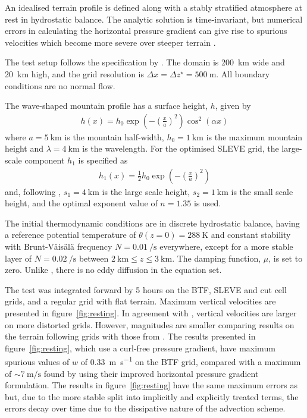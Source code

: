 \documentclass{ametsoc}
\begin{document}
An idealised terrain profile is defined along with a stably stratified atmosphere at rest in hydrostatic balance.  The analytic solution is time-invariant, but numerical errors in calculating the horizontal pressure gradient can give rise to spurious velocities which become more severe over steeper terrain \citep{klemp2011}.

The test setup follows the specification by \cite{klemp2011}.  The domain is \SI{200}{\kilo\meter} wide and \SI{20}{\kilo\meter} high, and the grid resolution is \(\Delta x = \Delta z^\star = \SI{500}{\meter}\).  All boundary conditions are no normal flow.

The wave-shaped mountain profile has a surface height, $h$, given by
\begin{align}
	h(x) = h_0 \exp \left( - \left( \frac{x}{a} \right)^2 \right) \cos^2 \left( \alpha x \right) \label{eqn:resting:mountain}
\end{align}
where $a = \SI{5}{\kilo\meter}$ is the mountain half-width, $h_0 = \SI{1}{\kilo\meter}$ is the maximum mountain height and $\lambda = \SI{4}{\kilo\meter}$ is the wavelength.  For the optimised SLEVE grid, the large-scale component $h_1$ is specified as
\begin{align}
h_1(x) = \frac{1}{2} h_0 \exp \left( - \left( \frac{x}{a} \right)^2 \right)
\end{align}
and, following \cite{leuenberger2010}, $s_1 = \SI{4}{\kilo\meter}$ is the large scale height, $s_2 = \SI{1}{\kilo\meter}$ is the small scale height, and the optimal exponent value of $n = 1.35$ is used.

The initial thermodynamic conditions are in discrete hydrostatic balance, having a reference potential temperature of $\theta(z = 0) = \SI{288}{\kelvin}$ and constant stability with Brunt-V\"ais\"al\"a frequency $N = \SI{0.01}{\per\second}$ everywhere, except for a more stable layer of $N = \SI{0.02}{\per\second}$ between $\SI{2}{\kilo\meter} \leq z \leq \SI{3}{\kilo\meter}$.  The damping function, \(\mu\), is set to zero.  Unlike \citet{klemp2011}, there is no eddy diffusion in the equation set.

The test was integrated forward by 5 hours on the BTF, SLEVE and cut cell grids, and a regular grid with flat terrain.  Maximum vertical velocities are presented in figure~\ref{fig:resting}.  In agreement with \citet{klemp2011}, vertical velocities are larger on more distorted grids.  However, magnitudes are smaller comparing results on the terrain following grids with those from \citet{klemp2011}.  
The results presented in figure~\ref{fig:resting}, which use a curl-free pressure gradient, have maximum spurious values of $w$ of \SI{0.33}{\meter\per\second} on the BTF grid, compared with a maximum of \(\sim \SI{7}{\meter\per\second}\) found by \citet{klemp2011} using their improved horizontal pressure gradient formulation.
The results in figure~\ref{fig:resting} have the same maximum errors as \citet{weller-shahrokhi2014} but, due to the more stable split into implicitly and explicitly treated terms, the errors decay over time due to the dissipative nature of the advection scheme.
\end{document}
